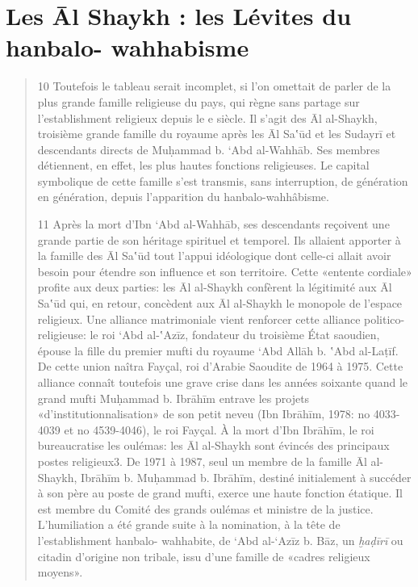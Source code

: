\hypertarget{les-ux101l-shaykh-les-luxe9vites-du-hanbalo--wahhabisme}{%
\section{Les Āl Shaykh : les Lévites du hanbalo-
wahhabisme}\label{les-ux101l-shaykh-les-luxe9vites-du-hanbalo--wahhabisme}}

\begin{quote}
10 Toutefois le tableau serait incomplet, si l'on omettait de parler de
la plus grande famille religieuse du pays, qui règne sans partage sur
l'establishment religieux depuis le
e siècle. Il s'agit des Āl al-Shaykh, troisième grande famille du
royaume après les Āl
Sa‛ūd et les Sudayrī et descendants directs de Muḥammad b. `Abd
al-Wahhāb. Ses membres détiennent, en effet, les plus hautes fonctions
religieuses. Le capital symbolique de cette famille s'est transmis, sans
interruption, de génération en génération, depuis l'apparition du
hanbalo-wahhâbisme.

11 Après la mort d'Ibn `Abd al-Wahhāb, ses descendants reçoivent une
grande partie de son héritage spirituel et temporel. Ils allaient
apporter à la famille des Āl Sa‛ūd tout l'appui idéologique dont
celle-ci allait avoir besoin pour étendre son influence et son
territoire. Cette «entente cordiale» profite aux deux parties: les Āl
al-Shaykh confèrent la légitimité aux Āl Sa‛ūd qui, en retour, concèdent
aux Āl al-Shaykh le monopole de l'espace religieux. Une alliance
matrimoniale vient renforcer cette alliance politico- religieuse: le roi
`Abd al-‛Azīz, fondateur du troisième État saoudien, épouse la fille du
premier mufti du royaume `Abd Allāh b. ‛Abd al-Laṭīf. De cette union
naîtra Fayçal, roi d'Arabie Saoudite de 1964 à 1975. Cette alliance
connaît toutefois une grave crise dans les années soixante quand le
grand mufti Muḥammad b. Ibrāhīm entrave les projets
«d'institutionnalisation» de son petit neveu (Ibn Ibrāhīm, 1978: no
4033-4039 et no
4539-4046), le roi Fayçal. À la mort d'Ibn Ibrāhīm, le roi bureaucratise
les oulémas: les Āl al-Shaykh sont évincés des principaux postes
religieux3. De 1971 à 1987, seul un membre de la famille Āl al-Shaykh,
Ibrāhīm b. Muḥammad b. Ibrāhīm, destiné initialement à succéder à son
père au poste de grand mufti, exerce une haute fonction étatique. Il est
membre du Comité des grands oulémas et ministre de la justice.
L'humiliation a été grande suite à la nomination, à la tête de
l'establishment hanbalo- wahhabite, de `Abd al-`Azīz b. Bāz, un
\emph{ḫaḍīrī} ou citadin d'origine non tribale, issu d'une famille de
«cadres religieux moyens».


\end{quote}
